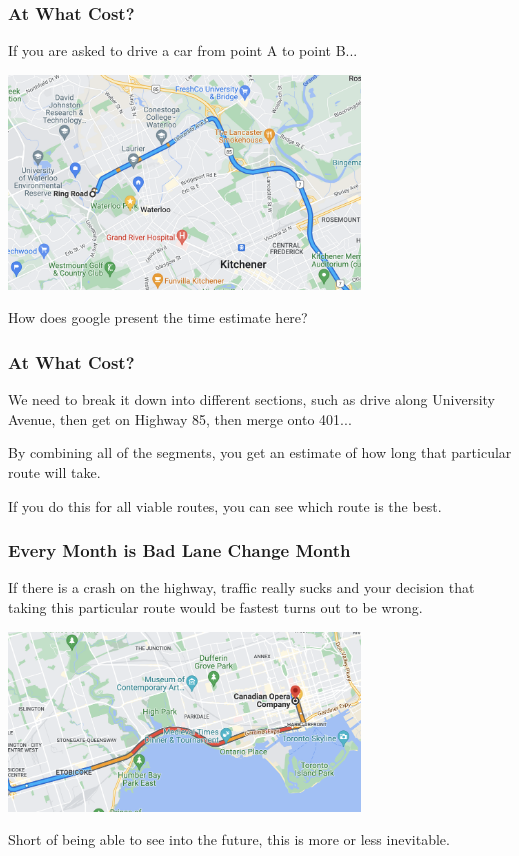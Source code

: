 \begin{frame}
\frametitle{At What Cost?}

If you are asked to drive a car from point A to point B...

\begin{center}
	\includegraphics[width=0.7\textwidth]{images/optimize-map.png}
\end{center}

How does google present the time estimate here?

\end{frame}

\begin{frame}
\frametitle{At What Cost?}

We need to break it down into different sections, such as drive along University Avenue, then get on Highway 85, then merge onto 401... 

By combining all of the segments, you get an estimate of how long that particular route will take. 

If you do this for all viable routes, you can see which route is the best. 

\end{frame}

\begin{frame}
\frametitle{Every Month is Bad Lane Change Month}

If there is a crash on the highway, traffic really sucks and your decision that taking this particular route would be fastest turns out to be wrong. 

\begin{center}
	\includegraphics[width=0.7\textwidth]{images/map-traffic.png}
\end{center}

Short of being able to see into the future, this is more or less inevitable.

\end{frame}

